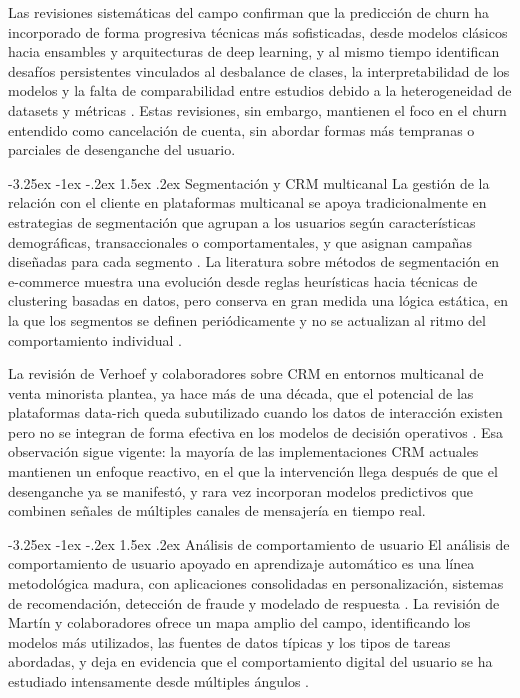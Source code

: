 \documentclass[11pt,a4paper]{article}
\makeatletter
\renewcommand\subsection{\@startsection{subsection}{2}{\z@}%
  {-3.25ex \@plus -1ex \@minus -.2ex}%
  {1.5ex \@plus .2ex}%
  {\normalfont\normalsize\itshape}}
\makeatother
\begin{document}
Las revisiones sistemáticas del campo confirman que la predicción de churn ha incorporado de forma progresiva técnicas más sofisticadas, desde modelos clásicos hacia ensambles y arquitecturas de deep learning, y al mismo tiempo identifican desafíos persistentes vinculados al desbalance de clases, la interpretabilidad de los modelos y la falta de comparabilidad entre estudios debido a la heterogeneidad de datasets y métricas \cite{barsotti2024decade, imani2025customer}. Estas revisiones, sin embargo, mantienen el foco en el churn entendido como cancelación de cuenta, sin abordar formas más tempranas o parciales de desenganche del usuario.
 
\subsection{Segmentación y CRM multicanal}
La gestión de la relación con el cliente en plataformas multicanal se apoya tradicionalmente en estrategias de segmentación que agrupan a los usuarios según características demográficas, transaccionales o comportamentales, y que asignan campañas diseñadas para cada segmento \cite{alvesgomes2023review}. La literatura sobre métodos de segmentación en e-commerce muestra una evolución desde reglas heurísticas hacia técnicas de clustering basadas en datos, pero conserva en gran medida una lógica estática, en la que los segmentos se definen periódicamente y no se actualizan al ritmo del comportamiento individual \cite{alvesgomes2023review}.
 
La revisión de Verhoef y colaboradores sobre CRM en entornos multicanal de venta minorista plantea, ya hace más de una década, que el potencial de las plataformas data-rich queda subutilizado cuando los datos de interacción existen pero no se integran de forma efectiva en los modelos de decisión operativos \cite{verhoef2010crm}. Esa observación sigue vigente: la mayoría de las implementaciones CRM actuales mantienen un enfoque reactivo, en el que la intervención llega después de que el desenganche ya se manifestó, y rara vez incorporan modelos predictivos que combinen señales de múltiples canales de mensajería en tiempo real.
 
\subsection{Análisis de comportamiento de usuario}
El análisis de comportamiento de usuario apoyado en aprendizaje automático es una línea metodológica madura, con aplicaciones consolidadas en personalización, sistemas de recomendación, detección de fraude y modelado de respuesta \cite{martin2021survey}. La revisión de Martín y colaboradores ofrece un mapa amplio del campo, identificando los modelos más utilizados, las fuentes de datos típicas y los tipos de tareas abordadas, y deja en evidencia que el comportamiento digital del usuario se ha estudiado intensamente desde múltiples ángulos \cite{martin2021survey}.
 
\end{document}
